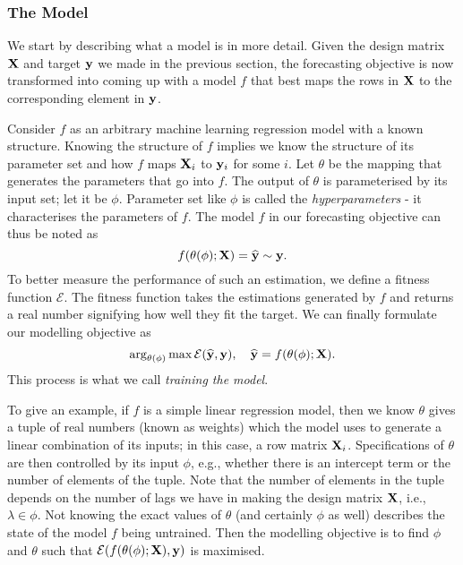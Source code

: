 \subsubsection{The Model}
We start by describing what a model is in more detail. Given the design matrix $\mathbf{X}$ and target $\mathbf{y}$ we made in the previous section, the forecasting objective is now transformed into coming up with a model $f$ that best maps the rows in $\mathbf{X}$ to the corresponding element in $\mathbf{y}$.

Consider $f$ as an arbitrary machine learning regression model with a known structure. Knowing the structure of $f$ implies we know the structure of its parameter set and how $f$ maps $\mathbf{X}_i$ to $\mathbf{y}_i$ for some $i$. Let $\theta$ be the mapping that generates the parameters that go into $f$. The output of $\theta$ is parameterised by its input set; let it be $\phi$. Parameter set like $\phi$ is called the \textit{hyperparameters} - it characterises the parameters of $f$. The model $f$ in our forecasting objective can thus be noted as
\begin{equation*}
    f(\theta(\phi); \mathbf{X}) = \widehat{\mathbf{y}} \sim \mathbf{y}.
\end{equation*}
To better measure the performance of such an estimation, we define a fitness function $\mathcal{E}$. The fitness function takes the estimations generated by $f$ and returns a real number signifying how well they fit the target. We can finally formulate our modelling objective as
\begin{equation}\label{eq: ml training}
    \arg_{\theta(\phi)} \max \mathcal{E}(\widehat{\mathbf{y}}, \mathbf{y}), \quad \widehat{\mathbf{y}} = f(\theta(\phi); \mathbf{X}).
\end{equation}
This process is what we call \textit{training the model}.

To give an example, if $f$ is a simple linear regression model, then we know $\theta$ gives a tuple of real numbers (known as weights) which the model uses to generate a linear combination of its inputs; in this case, a row matrix $\mathbf{X}_i$. Specifications of $\theta$ are then controlled by its input $\phi$, e.g., whether there is an intercept term or the number of elements of the tuple. Note that the number of elements in the tuple depends on the number of lags we have in making the design matrix $\mathbf{X}$, i.e., $\lambda \in \phi$. Not knowing the exact values of $\theta$ (and certainly $\phi$ as well) describes the state of the model $f$ being untrained. Then the modelling objective is to find $\phi$ and $\theta$ such that $\mathcal{E}(f(\theta(\phi); \mathbf{X}), \mathbf{y})$ is maximised.

